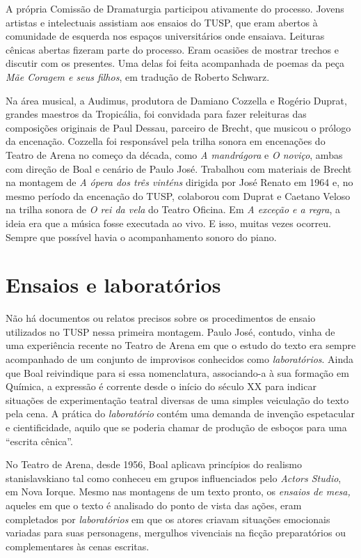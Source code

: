 A própria Comissão de Dramaturgia participou ativamente do processo.
Jovens artistas e intelectuais assistiam aos ensaios do TUSP, que eram
abertos à comunidade de esquerda nos espaços universitários onde
ensaiava. Leituras cênicas abertas fizeram parte do processo. Eram
ocasiões de mostrar trechos e discutir com os presentes. Uma delas foi
feita acompanhada de poemas da peça \textit{Mãe Coragem e seus filhos}, em
tradução de Roberto Schwarz.

Na área musical, a Audimus, produtora de Damiano Cozzella e Rogério
Duprat, grandes maestros da Tropicália, foi convidada para fazer
releituras das composições originais de Paul Dessau, parceiro de Brecht,
que musicou o prólogo da encenação. Cozzella foi responsável pela trilha
sonora em encenações do Teatro de Arena no começo da década, como \textit{A
mandrágora} e \textit{O noviço}, ambas com direção de Boal e cenário de
Paulo José. Trabalhou com materiais de Brecht na montagem de \textit{A
ópera dos três vinténs} dirigida por José Renato em 1964 e, no mesmo
período da encenação do TUSP, colaborou com Duprat e Caetano Veloso na
trilha sonora de \textit{O rei da vela} do Teatro Oficina. Em \textit{A
exceção e a regra}, a ideia era que a música fosse executada ao vivo. E
isso, muitas vezes ocorreu. Sempre que possível havia o acompanhamento
sonoro do piano.

\section{Ensaios e laboratórios}

Não há documentos ou relatos precisos sobre os procedimentos de ensaio
utilizados no TUSP nessa primeira montagem. Paulo José, contudo, vinha
de uma experiência recente no Teatro de Arena em que o estudo do texto
era sempre acompanhado de um conjunto de improvisos conhecidos como
\textit{laboratórios}. Ainda que Boal reivindique para si essa
nomenclatura, associando-a à sua formação em Química, a expressão é
corrente desde o início do século XX para indicar situações de
experimentação teatral diversas de uma simples veiculação do texto pela
cena. A prática do \textit{laboratório} contém uma demanda de invenção
espetacular e cientificidade, aquilo que se poderia chamar de produção
de esboços para uma “escrita cênica”.

No Teatro de Arena, desde 1956, Boal aplicava princípios do realismo
stanislavskiano tal como conheceu em grupos influenciados pelo
\textit{Actors Studio}, em Nova Iorque. Mesmo nas montagens de um texto
pronto, os \textit{ensaios de mesa,} aqueles em que o texto é analisado do
ponto de vista das ações, eram completados por \textit{laboratórios} em que
os atores criavam situações emocionais variadas para suas personagens,
mergulhos vivenciais na ficção preparatórios ou complementares às cenas
escritas.


